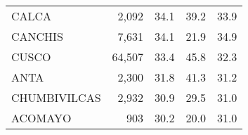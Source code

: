 \begin{tabular}{lrrrr}
	\cellcolor[HTML]{FD6864}CALCA                                           & 2,092                                                                 & 34.1                                                                             & 39.2                                                                        & 33.9                                                                                \\
	\cellcolor[HTML]{FD6864}CANCHIS                                         & 7,631                                                                 & 34.1                                                                             & 21.9                                                                        & 34.9                                                                                \\
	\cellcolor[HTML]{FD6864}CUSCO                                           & 64,507                                                                & 33.4                                                                             & 45.8                                                                        & 32.3                                                                                \\
	\cellcolor[HTML]{FD6864}ANTA                                            & 2,300                                                                 & 31.8                                                                             & 41.3                                                                        & 31.2                                                                                \\
	\cellcolor[HTML]{FD6864}CHUMBIVILCAS                                    & 2,932                                                                 & 30.9                                                                             & 29.5                                                                        & 31.0                                                                                \\
	\cellcolor[HTML]{FD6864}ACOMAYO                                         & 903                                                                   & 30.2                                                                             & 20.0                                                                        & 31.0                                                                                \\

\end{tabular}
